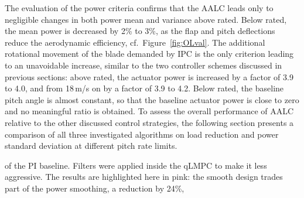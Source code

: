 The evaluation of the power criteria confirms that the AALC leads only to negligible changes in both power mean and variance above rated. Below rated, the mean power is decreased by 2\% to 3\%, as the flap and pitch deflections reduce the aerodynamic efficiency, cf.\ Figure~\ref{fig:OLval}. The additional rotational movement of the blade demanded by IPC is the only criterion leading to an unavoidable increase, similar to the two controller schemes discussed in previous sections: above rated, the actuator power is increased by a factor of 3.9 to 4.0, and from 18\,m/s on by a factor of 3.9 to 4.2. Below rated, the baseline pitch angle is almost constant, so that the baseline actuator power is close to zero and no meaningful ratio is obtained. To assess the overall performance of AALC relative to the other discussed control strategies, the following section presents a comparison of all three investigated algorithms on load reduction and  power standard deviation at different pitch rate limits.

of the PI baseline. Filters were applied inside the qLMPC to make it less aggressive. The results are highlighted here in pink: the smooth design trades part of the power smoothing, a reduction by 24\%,

